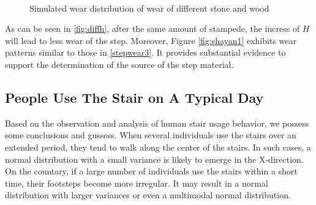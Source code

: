 \documentclass[12pt]{article}  %
\numberwithin{equation}{section} %
\begin{document}
\begin{figure}[H]
\vspace{0em}
	\centering    
    \vspace{-1.0em}
    \\
	\caption{Simulated wear distribution of wear of different stone and wood}		%
	\label{fig:diffh}									%
    \vspace{-1.0em}
\end{figure}
As can be seen in \autoref{fig:diffh}, after the same amount of stampede, the incress of $H$ will lead to less wear of the step. Moreover, Figure \autoref{fig:shayan1} exhibits wear patterns similar to those in \autoref{stepwear3}. It provides substantial evidence to support the determination of the source of the step material.





\subsection{People Use The Stair on A Typical Day}
Based on the observation and analysis of human stair usage behavior, we possess some conclusions and gussess. When several individuals use the stairs over an extended period, they tend to walk along the center of the stairs\cite{8}. In such cases, a normal distribution with a small variance is likely to emerge in the X-direction. On the countary, if a large number of individuals use the stairs within a short time, their footsteps become more irregular. It may result in a normal distribution with larger variances or even a multimodal normal distribution. 
\end{document}
